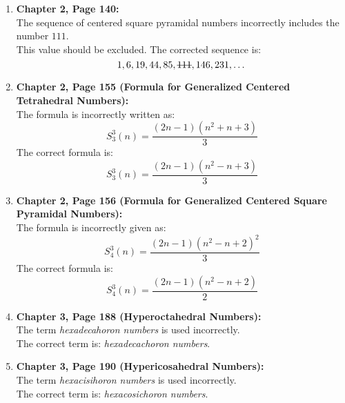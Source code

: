 \documentclass[10pt, a4paper]{article}
\begin{document}
\begin{enumerate}
  \item \textbf{Chapter 2, Page 140:} \\
        The sequence of centered square pyramidal numbers incorrectly includes the number \(111\). \\
        This value should be excluded. The corrected sequence is:
        \[
          1, 6, 19, 44, 85, \text{\sout{111}}, 146, 231, \dots
        \]

  \item \textbf{Chapter 2, Page 155 (Formula for Generalized Centered Tetrahedral Numbers):} \\
        The formula is incorrectly written as:
        \[
          S_3^3(n) = \frac{(2n - 1)(n^2 + n + 3)}{3}
        \]
        The correct formula is:
        \[
          S_3^3(n) = \frac{(2n - 1)(n^2 - n + 3)}{3}
        \]

  \item \textbf{Chapter 2, Page 156 (Formula for Generalized Centered Square Pyramidal Numbers):} \\
        The formula is incorrectly given as:
        \[
          S_4^3(n) = \frac{(2n - 1)(n^2 - n + 2)^2}{3}
        \]
        The correct formula is:
        \[
          S_4^3(n) = \frac{(2n - 1)(n^2 - n + 2)}{2}
        \]

  \item \textbf{Chapter 3, Page 188 (Hyperoctahedral Numbers):} \\
        The term \emph{hexadecahoron numbers} is used incorrectly. \\
        The correct term is: \emph{hexadecachoron numbers}.

  \item \textbf{Chapter 3, Page 190 (Hypericosahedral Numbers):} \\
        The term \emph{hexacisihoron numbers} is used incorrectly. \\
        The correct term is: \emph{hexacosichoron numbers}.
\end{enumerate}
\end{document}
